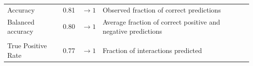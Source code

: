 \documentclass[10pt,oneside]{article}
\begin{document}
\begin{longtable}[]{@{}llll@{}}
\begin{minipage}[t]{0.21\columnwidth}
Accuracy\strut
\end{minipage} & \begin{minipage}[t]{0.05\columnwidth}\raggedright
0.81\strut
\end{minipage} & \begin{minipage}[t]{0.13\columnwidth}\raggedright
\(\rightarrow 1\)\strut
\end{minipage} & \begin{minipage}[t]{0.49\columnwidth}\raggedright
Observed fraction of correct predictions\strut
\end{minipage}\tabularnewline
\begin{minipage}[t]{0.21\columnwidth}\raggedright
Balanced accuracy\strut
\end{minipage} & \begin{minipage}[t]{0.05\columnwidth}\raggedright
0.80\strut
\end{minipage} & \begin{minipage}[t]{0.13\columnwidth}\raggedright
\(\rightarrow 1\)\strut
\end{minipage} & \begin{minipage}[t]{0.49\columnwidth}\raggedright
Average fraction of correct positive and negative predictions\strut
\end{minipage}\tabularnewline
\begin{minipage}[t]{0.21\columnwidth}\raggedright
\strut
\end{minipage} & \begin{minipage}[t]{0.05\columnwidth}\raggedright
\strut
\end{minipage} & \begin{minipage}[t]{0.13\columnwidth}\raggedright
\strut
\end{minipage} & \begin{minipage}[t]{0.49\columnwidth}\raggedright
\strut
\end{minipage}\tabularnewline
\begin{minipage}[t]{0.21\columnwidth}\raggedright
True Positive Rate\strut
\end{minipage} & \begin{minipage}[t]{0.05\columnwidth}\raggedright
0.77\strut
\end{minipage} & \begin{minipage}[t]{0.13\columnwidth}\raggedright
\(\rightarrow 1\)\strut
\end{minipage} & \begin{minipage}[t]{0.49\columnwidth}\raggedright
Fraction of interactions predicted\strut
\end{minipage}\tabularnewline

\end{longtable}
\end{document}

